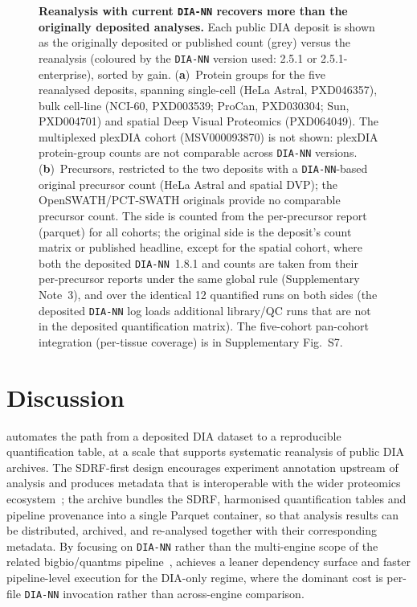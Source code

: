 \documentclass[preprint,12pt]{elsarticle}
\begin{document}
\begin{figure}[htbp]
  \centering
  \caption[Reanalysis vs original analysis]{%
    \textbf{Reanalysis with current \texttt{DIA-NN} recovers more than the
    originally deposited analyses.} Each public DIA deposit is shown as the
    originally deposited or published count (grey) versus the \quantmsdiann{}
    reanalysis (coloured by the \texttt{DIA-NN} version used: 2.5.1 or
    2.5.1-enterprise), sorted by gain.
    (\textbf{a})~Protein groups for the five reanalysed deposits, spanning
    single-cell (HeLa Astral, PXD046357), bulk cell-line (NCI-60, PXD003539;
    ProCan, PXD030304; Sun, PXD004701) and spatial Deep Visual Proteomics
    (PXD064049). The multiplexed plexDIA cohort (MSV000093870) is not shown:
    plexDIA protein-group counts are not comparable across \texttt{DIA-NN}
    versions.
    (\textbf{b})~Precursors, restricted to the two deposits with a
    \texttt{DIA-NN}-based original precursor count (HeLa Astral and spatial
    DVP); the OpenSWATH/PCT-SWATH originals provide no comparable precursor
    count.
    The \quantmsdiann{} side is counted from the per-precursor report (parquet)
    for all cohorts; the original side is the deposit's count matrix or published
    headline, except for the spatial cohort, where both the deposited
    \texttt{DIA-NN}~1.8.1 and \quantmsdiann{} counts are taken from their
    per-precursor reports under the same global rule (Supplementary Note~3), and
    over the identical 12 quantified runs on both sides (the deposited
    \texttt{DIA-NN} log loads additional library/QC runs that are not in the
    deposited quantification matrix). The
    five-cohort pan-cohort integration (per-tissue coverage) is in Supplementary
    Fig.~S7.
  }
  \label{fig:reanalysis}
\end{figure}

\section{Discussion}
\label{sec:discussion}
\quantmsdiann{} automates the path from a deposited DIA dataset to a reproducible quantification table, at a scale that supports systematic reanalysis of public DIA archives. The SDRF-first design encourages experiment annotation upstream of analysis and produces metadata that is interoperable with the wider proteomics ecosystem~\cite{dai2021sdrf}; the \qpx{} archive bundles the SDRF, harmonised quantification tables and pipeline provenance into a single Parquet container, so that analysis results can be distributed, archived, and re-analysed together with their corresponding metadata. By focusing on \texttt{DIA-NN} rather than the multi-engine scope of the related bigbio/quantms pipeline~\cite{dai2024quantms}, \quantmsdiann{} achieves a leaner dependency surface and faster pipeline-level execution for the DIA-only regime, where the dominant cost is per-file \texttt{DIA-NN} invocation rather than across-engine comparison.
\end{document}
